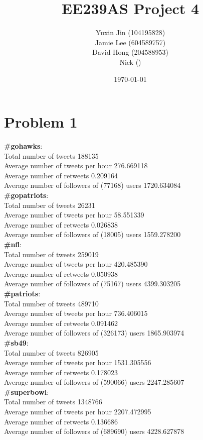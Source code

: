\documentclass[12pt]{article}
\begin{document}
\title{\textbf{EE239AS Project 4}}
\author{Yuxin Jin \quad (104195828)\\
		Jamie Lee \quad (604589757)\\
        David Hong \quad (204588953) \\
        Nick \quad ()}
\date{\today}

\maketitle

\section*{Problem 1}
\textbf{\#gohawks}: \\
Total number of tweets 188135 \\
Average number of tweets per hour 276.669118 \\
Average number of retweets 0.209164 \\
Average number of followers of (77168) users 1720.634084 \\

\textbf{\#gopatriots}: \\
Total number of tweets 26231 \\
Average number of tweets per hour 58.551339 \\
Average number of retweets 0.026838 \\
Average number of followers of (18005) users 1559.278200 \\

\textbf{\#nfl}: \\
Total number of tweets 259019 \\ 
Average number of tweets per hour 420.485390 \\
Average number of retweets 0.050938 \\
Average number of followers of (75167) users 4399.303205 \\

\textbf{\#patriots}: \\
Total number of tweets 489710 \\
Average number of tweets per hour 736.406015 \\
Average number of retweets 0.091462 \\
Average number of followers of (326173) users 1865.903974 \\

\textbf{\#sb49}: \\
Total number of tweets 826905 \\
Average number of tweets per hour 1531.305556 \\
Average number of retweets 0.178023 \\
Average number of followers of (590066) users 2247.285607 \\

\textbf{\#superbowl}: \\
Total number of tweets 1348766 \\
Average number of tweets per hour 2207.472995 \\
Average number of retweets 0.136686 \\
Average number of followers of (689690) users 4228.627878 \\
\end{document}

